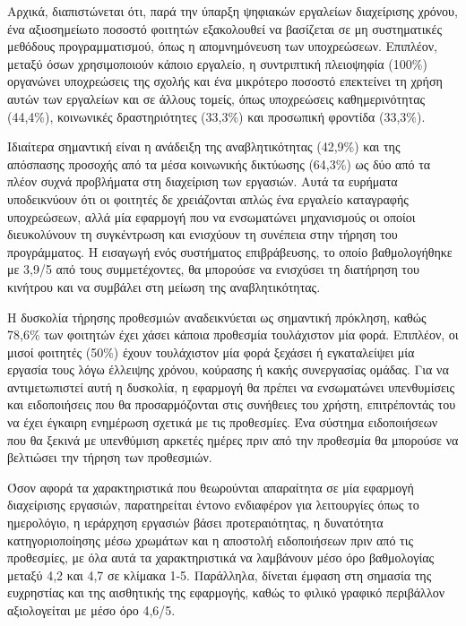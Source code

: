             Αρχικά, διαπιστώνεται ότι, παρά την ύπαρξη ψηφιακών εργαλείων διαχείρισης χρόνου, ένα αξιοσημείωτο ποσοστό φοιτητών εξακολουθεί να βασίζεται σε μη συστηματικές μεθόδους προγραμματισμού, όπως η απομνημόνευση των υποχρεώσεων. Επιπλέον, μεταξύ όσων χρησιμοποιούν κάποιο εργαλείο, η συντριπτική πλειοψηφία (100\%) οργανώνει υποχρεώσεις της σχολής και ένα μικρότερο ποσοστό επεκτείνει τη χρήση αυτών των εργαλείων και σε άλλους τομείς, όπως υποχρεώσεις καθημερινότητας (44,4\%), κοινωνικές δραστηριότητες (33,3\%) και προσωπική φροντίδα (33,3\%).

            Ιδιαίτερα σημαντική είναι η ανάδειξη της αναβλητικότητας (42,9\%) και της απόσπασης προσοχής από τα μέσα κοινωνικής δικτύωσης (64,3\%) ως δύο από τα πλέον συχνά προβλήματα στη διαχείριση των εργασιών. Αυτά τα ευρήματα υποδεικνύουν ότι οι φοιτητές δε χρειάζονται απλώς ένα εργαλείο καταγραφής υποχρεώσεων, αλλά μία εφαρμογή που να ενσωματώνει μηχανισμούς οι οποίοι διευκολύνουν τη συγκέντρωση και ενισχύουν τη συνέπεια στην τήρηση του προγράμματος. Η εισαγωγή ενός συστήματος επιβράβευσης, το οποίο βαθμολογήθηκε με 3,9/5 από τους συμμετέχοντες, θα μπορούσε να ενισχύσει τη διατήρηση του κινήτρου και να συμβάλει στη μείωση της αναβλητικότητας.

            Η δυσκολία τήρησης προθεσμιών αναδεικνύεται ως σημαντική πρόκληση, καθώς 78,6\% των φοιτητών έχει χάσει κάποια προθεσμία τουλάχιστον μία φορά. Επιπλέον, οι μισοί φοιτητές (50\%) έχουν τουλάχιστον μία φορά ξεχάσει ή εγκαταλείψει μία εργασία τους λόγω έλλειψης χρόνου, κούρασης ή κακής συνεργασίας ομάδας. Για να αντιμετωπιστεί αυτή η δυσκολία, η εφαρμογή θα πρέπει να ενσωματώνει υπενθυμίσεις και ειδοποιήσεις που θα προσαρμόζονται στις συνήθειες του χρήστη, επιτρέποντάς του να έχει έγκαιρη ενημέρωση σχετικά με τις προθεσμίες. Ένα σύστημα ειδοποιήσεων που θα ξεκινά με υπενθύμιση αρκετές ημέρες πριν από την προθεσμία θα μπορούσε να βελτιώσει την τήρηση των προθεσμιών.

            Όσον αφορά τα χαρακτηριστικά που θεωρούνται απαραίτητα σε μία εφαρμογή διαχείρισης εργασιών, παρατηρείται έντονο ενδιαφέρον για λειτουργίες όπως το ημερολόγιο, η ιεράρχηση εργασιών βάσει προτεραιότητας, η δυνατότητα κατηγοριοποίησης μέσω χρωμάτων και η αποστολή ειδοποιήσεων πριν από τις προθεσμίες, με όλα αυτά τα χαρακτηριστικά να λαμβάνουν μέσο όρο βαθμολογίας μεταξύ 4,2 και 4,7 σε κλίμακα 1-5. Παράλληλα, δίνεται έμφαση στη σημασία της ευχρηστίας και της αισθητικής της εφαρμογής, καθώς το φιλικό γραφικό περιβάλλον αξιολογείται με μέσο όρο 4,6/5.

